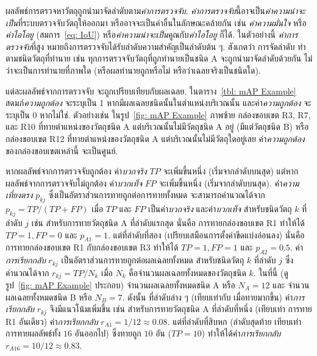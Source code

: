 ผลลัพธ์การตรวจหาวัตถุถูกนำมาจัดลำดับตาม\textit{ค่าการตรวจจับ}.
\textit{ค่าการตรวจจับ}นี้อาจเป็น\textit{ค่าความน่าจะเป็น}ที่ระบบตรวจจับวัตถุให้ออกมา 
หรืออาจจะเป็นค่าอื่นในลักษณะคล้ายกัน 
เช่น
\textit{ค่าความมั่นใจ}\cite{YOLO1} 
หรือ\textit{ค่าไอโอยู} (สมการ~\ref{eq: IoU})
หรือ\textit{ค่าความน่าจะเป็น}คูณกับ\textit{ค่าไอโอยู}\cite{YOLO2}
ก็ได้.
ในตัวอย่างนี้ \textit{ค่าการตรวจจับ}ที่สูง หมายถึงการตรวจจับได้รับลำดับความสำคัญเป็นลำดับต้น ๆ.
สังเกตว่า การจัดลำดับ ทำตามชนิดวัตถุที่ทำนาย
เช่น ทุกการตรวจจับวัตถุที่ถูกทำนายเป็นชนิด A จะถูกนำมาจัดลำดับด้วยกัน ไม่ว่าจะเป็นการทำนายที่ภาพใด (หรือผลทำนายถูกหรือไม่ หรือว่าเฉลยจริงเป็นชนิดใด).

แต่ละผลลัพธ์จากการตรวจจับ จะถูกเปรียบเทียบกับผลเฉลย. 
ในตาราง~\ref{tbl: mAP Example} สดมภ์\textit{ความถูกต้อง} จะระบุเป็น 1 หากมีผลเฉลยชนิดนั้นในตำแหน่งบริเวณนั้น
และค่า\textit{ความถูกต้อง} จะระบุเป็น 0 หากไม่ใช่.
ตัวอย่างเช่น ในรูป~\ref{fig: mAP Example} ภาพซ้าย 
กล่องขอบเขต R3, R7, และ R10 ที่ทายตำแหน่งของวัตถุชนิด A แต่บริเวณนั้นไม่มีวัตถุชนิด A อยู่ (มีแต่วัตถุชนิด B) หรือ กล่องขอบเขต R12 ที่ทายตำแหน่งของวัตถุชนิด A แต่บริเวณนั้นไม่มีวัตถุใดอยู่เลย
ค่า\textit{ความถูกต้อง}ของกล่องขอบเขตเหล่านี้ จะเป็นศูนย์.

หากผลลัพธ์จากการตรวจจับถูกต้อง ค่า\textit{บวกจริง} $TP$ จะเพิ่มขึ้นหนึ่ง (เริ่มจากลำดับบนสุด)
แต่หากผลลัพธ์จากการตรวจจับไม่ถูกต้อง ค่า\textit{บวกเท็จ} $FP$ จะเพิ่มขึ้นหนึ่ง (เริ่มจากลำดับบนสุด).
ค่า\textit{ความเที่ยงตรง} $p_{kj}$ ซึ่งเป็นอัตราส่วนการทายถูกต่อการทายทั้งหมด
จะสามารถคำนวณได้จาก $p_{kj} = TP/(TP +FP)$ เมื่อ $TP$ และ $FP$ เป็นค่า\textit{บวกจริง} และค่า\textit{บวกเท็จ} สำหรับชนิดวัตถุ $k$ ที่ลำดับ $j$
เช่น สำหรับการทายวัตถุชนิด A ที่ลำดับแรกสุด นั่นคือ การทายกล่องขอบเขต R1 ทำให้ได้ $TP = 1, FP = 0$ และ $p_{A1} = 1$.
แต่ที่ลำดับที่สอง (เปรียบเสมือนการตั้งค่าขีดแบ่งอ่อนลง) 
นั่นคือ การทายกล่องขอบเขต R1 กับกล่องขอบเขต R3 ทำให้ได้ $TP = 1, FP = 1$ และ $p_{A2} = 0.5$.
ค่า\textit{การเรียกกลับ} $r_{kj}$ เป็นอัตราส่วนการทายถูกต่อผลเฉลยทั้งหมด สำหรับชนิดวัตถุ $k$ ที่ลำดับ $j$
ซึ่งคำนวณได้จาก $r_{kj} = TP/N_k$ เมื่อ $N_k$ คือจำนวนผลเฉลยทั้งหมดของวัตถุชนิด $k$.
ในที่นี้ (ดูรูป~\ref{fig: mAP Example} ประกอบ)
จำนวนผลเฉลยทั้งหมดชนิด A หรือ $N_A = 12$
และ
จำนวนผลเฉลยทั้งหมดชนิด B หรือ $N_B = 7$.
ดังนั้น ที่ลำดับล่าง ๆ (เทียบเท่ากับ เมื่อทายมากขึ้น) ค่า\textit{การเรียกกลับ} $r_{kj}$ จึงมีแนวโน้มเพิ่มขึ้น เช่น
สำหรับการทายวัตถุชนิด A ที่ลำดับที่หนึ่ง (เทียบเท่า การทาย R1 อันเดียว) ค่า\textit{การเรียกกลับ} $r_{A1} = 1/12 \approx 0.08$.
แต่ที่ลำดับที่สิบหก (ลำดับสุดท้าย เทียบเท่า การทายผลลัพธ์ทั้ง $16$ อันออกไป) ซึ่งทายถูก $10$ อัน ($TP = 10$) ทำให้ได้ค่า\textit{การเรียกกลับ} $r_{A16} = 10/12 \approx 0.83$.

